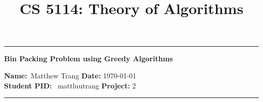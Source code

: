 \documentclass[11pt]{article}
\title{CS 5114: Theory of Algorithms}
\begin{document}


\begin{center}
	\hrule
	\vspace{.4cm}
	{\textbf { \large Bin Packing Problem using Greedy Algorithms}}
\end{center}
\textbf{Name:}\ Matthew Trang \hspace{\fill} \textbf{Date:} \today \\
{ \textbf{Student PID:}} \ mattluutrang \hspace{\fill} \textbf{Project: } 2
\vspace{.4cm}
\hrule

\end{document}
